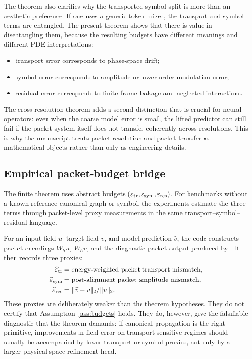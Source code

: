 The theorem also clarifies why the transported-symbol split is more than an aesthetic preference. If one uses a generic token mixer, the transport and symbol terms are entangled. The present theorem shows that there is value in disentangling them, because the resulting budgets have different meanings and different PDE interpretations:
\begin{itemize}
\item transport error corresponds to phase-space drift;
\item symbol error corresponds to amplitude or lower-order modulation error;
\item residual error corresponds to finite-frame leakage and neglected interactions.
\end{itemize}
The cross-resolution theorem adds a second distinction that is crucial for neural operators: even when the coarse model error is small, the lifted predictor can still fail if the packet system itself does not transfer coherently across resolutions. This is why the manuscript treats packet resolution and packet transfer as mathematical objects rather than only as engineering details.

\subsection{Empirical packet-budget bridge}
\label{sec:empirical-packet-bridge}

The finite theorem uses abstract budgets $(\varepsilon_{\mathrm{tr}},\varepsilon_{\mathrm{sym}},\varepsilon_{\mathrm{res}})$. For benchmarks without a known reference canonical graph or symbol, the experiments estimate the three terms through packet-level proxy measurements in the same transport--symbol--residual language.

For an input field $u$, target field $v$, and model prediction $\widehat v$, the code constructs packet encodings $W_h u$, $W_h v$, and the diagnostic packet output produced by \MiNO. It then records three proxies:
\[
\begin{aligned}
\widehat{\varepsilon}_{\mathrm{tr}}
&= \text{energy-weighted packet transport mismatch},\\
\widehat{\varepsilon}_{\mathrm{sym}}
&= \text{post-alignment packet amplitude mismatch},\\
\widehat{\varepsilon}_{\mathrm{res}}
&= \|\widehat v-v\|_2/\|v\|_2 .
\end{aligned}
\]
These proxies are deliberately weaker than the theorem hypotheses. They do not certify that Assumption~\ref{ass:budgets} holds. They do, however, give the falsifiable diagnostic that the theorem demands: if canonical propagation is the right primitive, improvements in field error on transport-sensitive regimes should usually be accompanied by lower transport or symbol proxies, not only by a larger physical-space refinement head.

